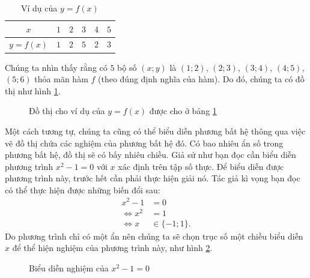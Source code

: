 \begin{table}[H]
   \centering
   \begin{tabular}{|c|c|c|c|c|c|}
      \hline
      $x$ & $1$ & $2$ & $3$ & $4$ & $5$ \\
      \hline
      $y=f(x)$ & $1$ & $2$ & $5$ & $2$ & $3$ \\
      \hline
   \end{tabular}
   \caption{Ví dụ của $y = f(x)$}
   \label{tab:ham_so_mot_bien:dinh_nghia:vddths}
\end{table}

\noindent Chúng ta nhìn thấy rằng có $5$ bộ số $(x;y)$ là $(1;2)$, $(2;3)$, $(3;4)$, $(4;5)$, $(5;6)$ thỏa mãn hàm $f$ (theo đúng định nghĩa của hàm). Do đó, chúng ta có đồ thị như hình \ref{fig:ham_so_mot_bien:dinh_nghia:vddths}. 

\begin{figure}[H]
   \centering
   \caption{Đồ thị cho ví dụ của $y = f(x)$ được cho ở bảng \ref{tab:ham_so_mot_bien:dinh_nghia:vddths}}
   \label{fig:ham_so_mot_bien:dinh_nghia:vddths}
\end{figure}

Một cách tương tự, chúng ta cũng có thể biểu diễn phương bất hệ thông qua việc vẽ đồ thị chứa các nghiệm của phương bất hệ đó. Có bao nhiêu ẩn số trong phương bất hệ, đồ thị sẽ có bấy nhiêu chiều. Giả sử như bạn đọc cần biểu diễn phương trình $x^2 - 1 = 0$ với $x$ xác định trên tập số thực. Để biểu diễn được phương trình này, trước hết cần phải thực hiện giải nó. Tác giả kì vọng bạn đọc có thể thực hiện được những biến đổi sau:
\begin{align*}
   x^2 - 1 &= 0 \\
   \iff x^2 &= 1 \\
   \iff x &\in \{-1; 1\}.
\end{align*}
Do phương trình chỉ có một ẩn nên chúng ta sẽ chọn trục số một chiều biểu diễn $x$ để thể hiện nghiệm của phương trình này, như hình \ref{fig:ham_so_mot_bien:dinh_nghia:vdgpt}.

\begin{figure}[h]
   \centering
   \caption{Biểu diễn nghiệm của $x^2 - 1 = 0$}
   \label{fig:ham_so_mot_bien:dinh_nghia:vdgpt}
\end{figure}

